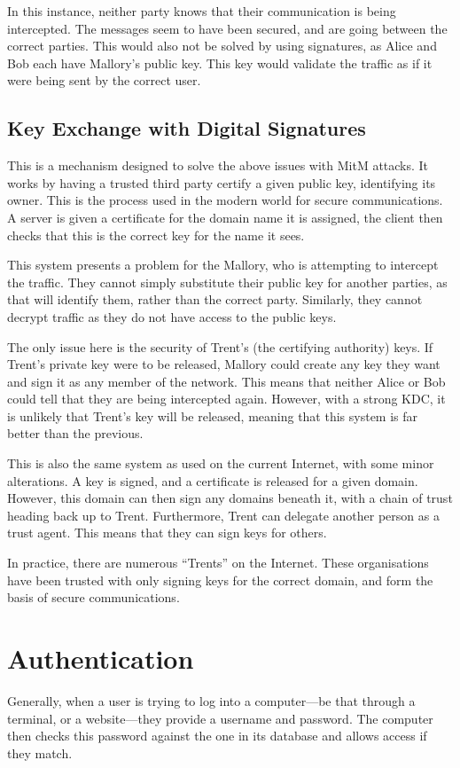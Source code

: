 			In this instance, neither party knows that their communication is being intercepted. 
			The messages seem to have been secured, and are going between the correct parties. 
			This would also not be solved by using signatures, as Alice and Bob each have Mallory's public key. 
			This key would validate the traffic as if it were being sent by the correct user. 

		\subsection{Key Exchange with Digital Signatures}
			This is a mechanism designed to solve the above issues with MitM attacks. 
			It works by having a trusted third party certify a given public key, identifying its owner. 
			This is the process used in the modern world for secure communications. 
			A server is given a certificate for the domain name it is assigned, the client then checks that this is the correct key for the name it sees. 

			This system presents a problem for the Mallory, who is attempting to intercept the traffic. 
			They cannot simply substitute their public key for another parties, as that will identify them, rather than the correct party. 
			Similarly, they cannot decrypt traffic as they do not have access to the public keys. 

			The only issue here is the security of Trent's (the certifying authority) keys.
			If Trent's private key were to be released, Mallory could create any key they want and sign it as any member of the network. 
			This means that neither Alice or Bob could tell that they are being intercepted again. 
			However, with a strong KDC, it is unlikely that Trent's key will be released, meaning that this system is far better than the previous. 

			This is also the same system as used on the current Internet, with some minor alterations. 
			A key is signed, and a certificate is released for a given domain. 
			However, this domain can then sign any domains beneath it, with a chain of trust heading back up to Trent. 
			Furthermore, Trent can delegate another person as a trust agent. 
			This means that they can sign keys for others. 

			In practice, there are numerous ``Trents'' on the Internet. 
			These organisations have been trusted with only signing keys for the correct domain, 
			and form the basis of secure communications. 
	\section{Authentication}
		Generally, when a user is trying to log into a computer---be that through a terminal, or a website---they provide a username and password. 
		The computer then checks this password against the one in its database and allows access if they match. 


